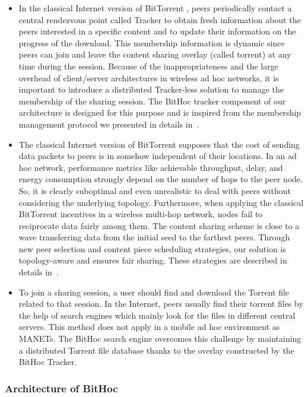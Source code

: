 \begin{itemize}
\item{In the classical Internet version of BitTorrent \cite{RefBT}, peers periodically contact a central rendezvous point called Tracker to obtain fresh information about the peers interested in a specific content and to update their information on the progress of the download. This membership information is dynamic since peers can join and leave the content sharing overlay (called torrent) at any time during the session. Because of the inappropriateness and the large overhead of client/server architectures in wireless ad hoc networks, it is important to introduce a distributed Tracker-less solution to manage the membership of the sharing session. The BitHoc tracker component of our architecture is designed for this purpose and is inspired from the membership management protocol we presented in details in~\cite{BitHoc}.}
\item{The classical Internet version of BitTorrent \cite{RefBT} supposes that the cost of sending data packets to peers is in somehow independent of their locations. In an ad hoc network, performance metrics like achievable throughput, delay, and energy consumption strongly depend on the number of hops to the peer node. So, it is clearly suboptimal and even unrealistic to deal with peers without considering the underlying topology. Furthermore, when applying the classical BitTorrent incentives in a wireless multi-hop network, nodes fail to reciprocate data fairly among them. The content sharing scheme is close to a wave transferring data from the initial seed to the farthest peers. Through new peer selection and content piece scheduling strategies, our solution is topology-aware and ensures fair sharing. These strategies are described in details in~\cite{BitHoc}.}
\item{To join a sharing session, a user should find and download the Torrent file related to that session. In the Internet, peers usually find their torrent files by the help of search engines which mainly look for the files in different central servers. This method does not apply in a mobile ad hoc environment as MANETs. The BitHoc search engine overcomes this challenge by maintaining a distributed Torrent file database thanks to the overlay constructed by the BitHoc Tracker.}
\end{itemize}

\subsubsection{Architecture of BitHoc}
\label{secarchitecture}

